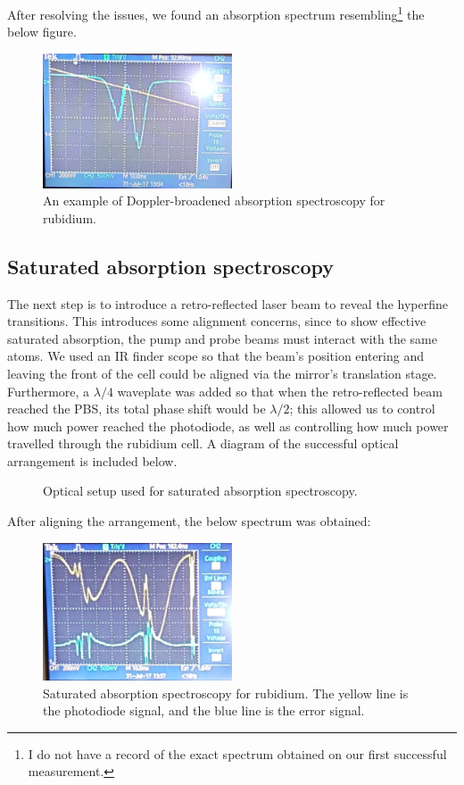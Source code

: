 \documentclass[11pt,twoside,a4paper]{article}
\begin{document}
After resolving the issues, we found an absorption spectrum resembling\footnote{I do not have a record of the exact spectrum obtained on our first successful measurement.} the below figure.
\begin{figure}[h]
    \centering
    \includegraphics[width=0.5\textwidth]{images/broadened-spec}
    \caption{An example of Doppler-broadened absorption spectroscopy for rubidium.}
\end{figure}
\subsection{Saturated absorption spectroscopy}
The next step is to introduce a retro-reflected laser beam to reveal the hyperfine transitions. This introduces some alignment concerns, since to show effective saturated absorption, the pump
and probe beams must interact with the same atoms. We used an IR finder scope so that the beam's position entering and leaving the front of the cell could be aligned via the mirror's translation
stage. Furthermore, a \(\lambda/4\) waveplate was added so that when the retro-reflected beam reached the PBS, its total phase shift would be \(\lambda/2\); this allowed us to control how much
power reached the photodiode, as well as controlling how much power travelled through the rubidium cell. A diagram of the successful optical arrangement is included below.
\begin{figure}[h]
    \centering
    \caption{Optical setup used for saturated absorption spectroscopy.}
\end{figure}

After aligning the arrangement, the below spectrum was obtained:
\begin{figure}[h]
    \centering
    \includegraphics[width=0.5\textwidth]{images/satabs-shit-error}
    \caption{Saturated absorption spectroscopy for rubidium. The yellow line is the photodiode signal, and the blue line is the error signal.}
\end{figure}
\end{document}

